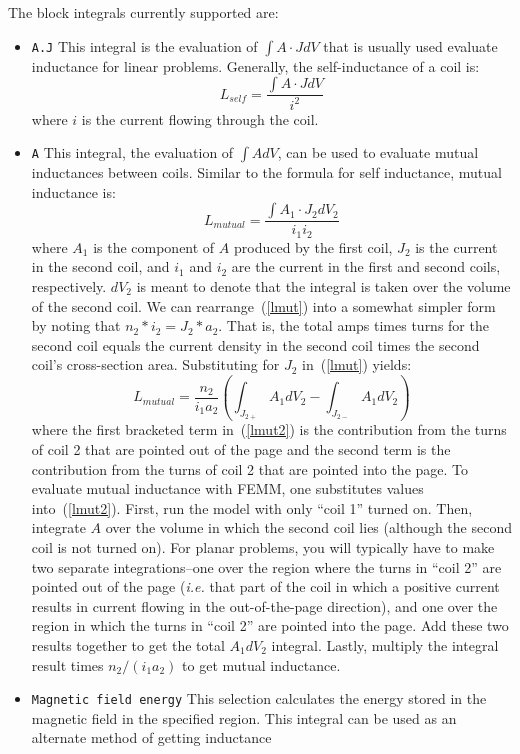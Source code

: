 \documentclass[12pt]{report}
\newcommand{\be}{\begin{equation}}
\newcommand{\ee}{\end{equation}}
\begin{document}
The block integrals currently supported are:
\begin{itemize}
\item {\tt A.J}  This integral is the evaluation of $\int A \cdot J
dV$ that is usually used evaluate inductance for linear problems.
Generally, the self-inductance of a coil is:
\be L_{self}= \frac{\int A \cdot J dV}{i^2} \ee
where $i$ is the current flowing through the coil.
\item {\tt A}  This integral, the evaluation of $\int A dV$, can be used to evaluate mutual
inductances between coils.  Similar to the formula for self
inductance, mutual inductance is:
\be \label{lmut} L_{mutual} = \frac{\int A_1 \cdot J_2 dV_2}{i_1 i_2} \ee
where $A_1$ is the component of $A$ produced by the first coil,
$J_2$ is the current in the second coil, and $i_1$ and $i_2$ are
the current in the first and second coils, respectively.  $dV_2$ is
meant to denote that the integral is taken over the volume of the
second coil.  We can rearrange~(\ref{lmut}) into a somewhat simpler
form by noting that $n_2 * i_2 = J_2 * a_2$.  That is, the total
amps times turns for the second coil equals the current density in
the second coil times the second coil's cross-section area.
Substituting for $J_2$ in~(\ref{lmut}) yields:
\be \label{lmut2}
L_{mutual} = \frac{n_2}{i_1 a_2} \left(\int_{J_{2+}} A_1 dV_2 -
\int_{J_{2-}} A_1 dV_2 \right)
\ee where the first bracketed term in~(\ref{lmut2}) is the contribution from
the turns of coil 2 that are pointed out of the page and the second
term is the contribution from the turns of coil 2 that are pointed
into the page.  To evaluate mutual inductance with FEMM, one
substitutes values into~(\ref{lmut2}). First, run the model with
only ``coil 1'' turned on. Then, integrate $A$ over the volume in
which the second coil lies (although the second coil is not turned
on). For planar problems, you will typically have to make two
separate integrations--one over the region where the turns in
``coil 2'' are pointed out of the page ({\em i.e.} that part of the
coil in which a positive current results in current flowing in the
out-of-the-page direction), and one over the region in which the
turns in ``coil 2'' are pointed into the page.  Add these two
results together to get the total $A_1 dV_2$ integral. Lastly,
multiply the integral result times $n_2/(i_1 a_2)$ to get mutual
inductance.
\item {\tt Magnetic field energy} This selection calculates the energy
stored in the magnetic field in the specified region.  This
integral can be used as an alternate method of getting inductance

\end{itemize}
\end{document}
